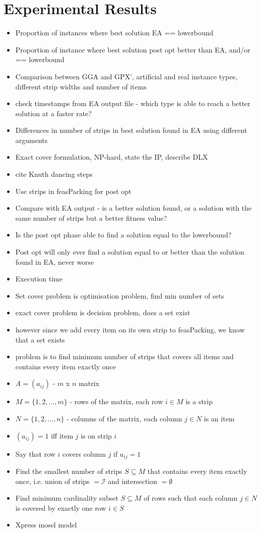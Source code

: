 \documentclass{elsarticle}
\begin{document}
\section{Experimental Results}
\begin{itemize}
	\item Proportion of instances where best solution EA == lowerbound
	\item Proportion of instance where best solution post opt better than EA, and/or == lowerbound
	\item Comparison between GGA and GPX', artificial and real instance types, different strip widths and number of items
	\item check timestamps from EA output file - which type is able to reach a better solution at a faster rate?
	\item Differences in number of strips in best solution found in EA using different arguments
	\item Exact cover formulation, NP-hard, state the IP, describe DLX
	\item cite Knuth dancing steps
	\item Use strips in feasPacking for post opt
	\item Compare with EA output - is a better solution found, or a solution with the same number of strips but a better fitness value?
	\item Is the post opt phase able to find a solution equal to the lowerbound?
	\item Post opt will only ever find a solution equal to or better than the solution found in EA, never worse
	\item Execution time
	\item Set cover problem is optimisation problem, find min number of sets
	\item exact cover problem is decision problem, does a set exist
	\item however since we add every item on its own strip to feasPacking, we know that a set exists
	\item problem is to find minimum number of strips that covers all items and contains every item exactly once
	\item $A = (a_{ij})$ - $m$ x $n$ matrix
	\item $M = \{1, 2,..., m\}$ - rows of the matrix, each row $i \in M$ is a strip
	\item $N = \{1, 2,...,n\}$ - columns of the matrix, each column $j \in N$ is an item
	\item $(a_{ij}) = 1$ iff item $j$ is on strip $i$
	\item Say that row $i$ covers column $j$ if $a_{ij} = 1$
	\item Find the smallest number of strips $S \subseteq M$ that contains every item exactly once, i.e. union of strips $= \mathcal{I}$ and intersection $= \emptyset$
	\item Find minimum cardinality subset $S \subseteq M$ of rows such that each column $j \in N$ is covered by exactly one row $i \in S$
	\item Xpress mosel model
\end{itemize}
\end{document}
